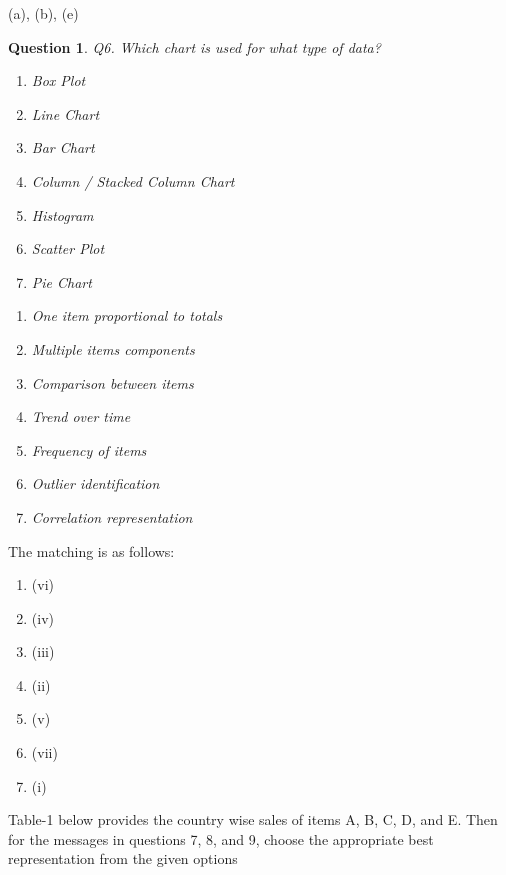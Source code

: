 \documentclass[11pt,fleqn]{book} %
\newtheorem{question}{Question}
\begin{document}
\begin{example}
\begin{rotanswer}
  (a), (b), (e)
\end{rotanswer}

\begin{question}
  Q6. Which chart is used for what type of data?
  \begin{multicols}{2}
    \begin{enumerate}[label=(\alph*)]
      \item Box Plot
      \item Line Chart
      \item Bar Chart
      \item Column / Stacked Column Chart
      \item Histogram
      \item Scatter Plot
      \item Pie Chart
    \end{enumerate}
    \columnbreak
    \begin{enumerate}[label=(\roman*)]
      \item One item proportional to totals
      \item Multiple items components
      \item Comparison between items
      \item Trend over time
      \item Frequency of items
      \item Outlier identification
      \item Correlation representation
    \end{enumerate}
  \end{multicols}
\end{question}

\begin{rotanswer}
  The matching is as follows:
  \begin{enumerate}[label=(\alph*)]
    \item (vi)
    \item (iv)
    \item (iii)
    \item (ii)
    \item (v)
    \item (vii)
    \item (i)
  \end{enumerate}
\end{rotanswer}


\newpage

\begin{remark}
Table-1 below provides the country wise sales of items A, B, C, D, and E.
Then for the messages in questions 7, 8, and 9, choose the
appropriate best representation from the given options
\end{remark}


\end{example}
\end{document}
